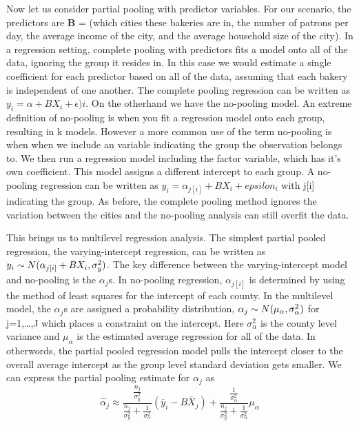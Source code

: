 \documentclass[12pt,twoside]{reedthesis}
\begin{document}
Now let us consider partial pooling with predictor variables. For our scenario, the predictors are
\textbf{B} = (which cities these bakeries are in, the number of patrons per day, the average income of the city, and the average household size of the city).
In a regression setting, complete pooling with predictors fits a model onto all of the data, ignoring the group it resides in. In this case we would estimate a single coefficient for each predictor based on all of the data, assuming that each bakery is independent of one another. The complete pooling regression can be written as \(y_i = \alpha + BX_i + \epsilon)i\). On the otherhand we have the no-pooling model. An extreme definition of no-pooling is when you fit a regression model onto each group, resulting in k models. However a more common use of the term no-pooling is when when we include an variable indicating the group the observation belongs to. We then run a regression model including the factor variable, which has it's own coefficient. This model assigns a different intercept to each group. A no-pooling regression can be written as \(y_i = \alpha_{j[i]} + B X_i + epsilon_i\) with j{[}i{]} indicating the group. As before, the complete pooling method ignores the variation between the cities and the no-pooling analysis can still overfit the data.

This brings us to multilevel regression analysis. The simplest partial pooled regression, the varying-intercept regression, can be written as \(y_i \sim N(\alpha_{j[i]} + BX_i, \space \sigma_y^2)\). The key difference between the varying-intercept model and no-pooling is the \(\alpha_j\)s. In no-pooling regression, \(\alpha_{j[i]}\) is determined by using the method of least squares for the intercept of each county. In the multilevel model, the \(\alpha_{j}\)s are assigned a probability distribution,
\(\alpha_j \sim N(\mu_\alpha, \space \sigma_\alpha^2)\) for j=1,\ldots{},J
which places a constraint on the intercept. Here \(\sigma_\alpha^2\) is the county level variance and \(\mu_\alpha\) is the estimated average regression for all of the data. In otherwords, the partial pooled regression model pulls the intercept closer to the overall average intercept as the group level standard deviation gets smaller. We can express the partial pooling estimate for \(\alpha_j\) as
\[ \hat{\alpha}_j \approx \frac{\frac{n_j}{\sigma_y^2}}{\frac{n_j}{\sigma_y^2} + \frac{1}{\sigma^2_\alpha}}(\overline{y}_i - B\overline{X}_j) + \frac{\frac{1}{\sigma_\alpha^2}}{\frac{n_j}{\sigma_y^2} + \frac{1}{\sigma^2_\alpha}}\mu_\alpha\]
\end{document}
